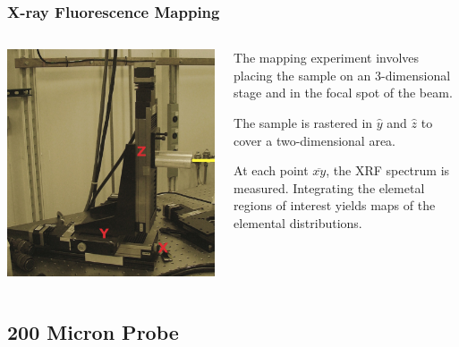 \documentclass[10pt, xcolor=x11names, compress, handout]{beamer}
\begin{document}
\begin{frame}
  \frametitle{X-ray Fluorescence Mapping}

  \begin{columns}
    \begin{column}{0.5\linewidth}
      \includegraphics[width=0.9\linewidth]{xrf/raster.jpg}
    \end{column}
    \begin{column}{0.5\linewidth}
      The mapping experiment involves placing the sample on an
      3-dimensional stage and in the focal spot of the beam.

      \bigskip

      The sample is rastered in $\hat{y}$ and $\hat{z}$ to cover a
      two-dimensional area.

      \bigskip

      At each point $\overline{xy}$, the XRF spectrum is measured.
      Integrating the elemetal regions of interest yields maps of the
      elemental distributions.
    \end{column}
  \end{columns}
\end{frame}

\subsection[200 $\mu$m]{200 Micron Probe}
\end{document}
